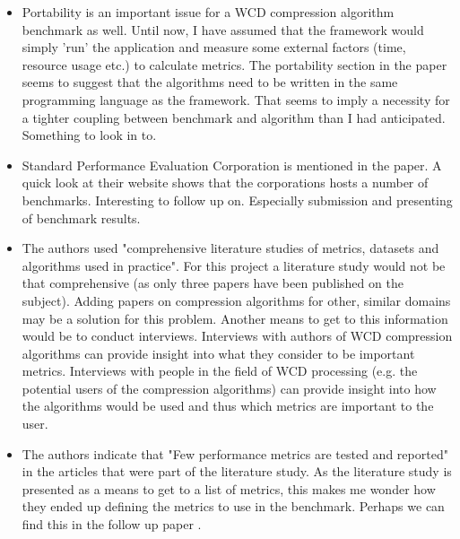 \begin{itemize}
\item Portability is an important issue for a WCD compression algorithm benchmark as well. Until now, I have assumed that the framework would simply 'run' the application and measure some external factors (time, resource usage etc.) to calculate metrics. The portability section in the paper seems to suggest that the algorithms need to be written in the same programming language as the framework. That seems to imply a necessity for a tighter coupling between benchmark and algorithm than I had anticipated. Something to look in to.
\item Standard Performance Evaluation Corporation is mentioned in the paper. A quick look at their website shows that the corporations hosts a number of benchmarks. Interesting to follow up on. Especially submission and presenting of benchmark results.
\item The authors used "comprehensive literature studies of metrics, datasets and algorithms used in practice". For this project a literature study would not be that comprehensive (as only three papers have been published on the subject). Adding papers on compression algorithms for other, similar domains may be a solution for this problem. 
Another means to get to this information would be to conduct interviews. Interviews with authors of WCD compression algorithms can provide insight into what they consider to be important metrics. Interviews with people in the field of WCD processing (e.g. the potential users of the compression algorithms) can provide insight into how the algorithms would be used and thus which metrics are important to the user. 
\item The authors indicate that "Few performance metrics are tested and reported" in the articles that were part of the literature study. As the literature study is presented as a means to get to a list of metrics, this makes me wonder how they ended up defining the metrics to use in the benchmark. Perhaps we can find this in the follow up paper \cite{capotua2015graphalytics}.
\end{itemize}




